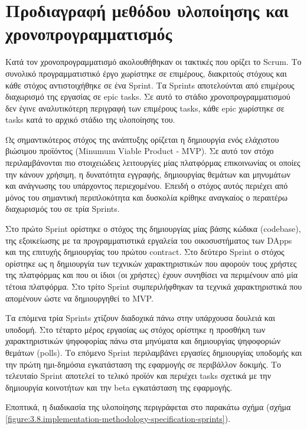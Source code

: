 \section{Προδιαγραφή μεθόδου υλοποίησης και χρονοπρογραμματισμός} \label{section:3-8-implementation-methodology-specification}

Κατά τον χρονοπρογραμματισμό ακολουθήθηκαν οι τακτικές που ορίζει το Scrum. Το συνολικό προγραμματιστικό έργο χωρίστηκε σε επιμέρους, διακριτούς στόχους και κάθε στόχος αντιστοιχήθηκε σε ένα Sprint. Τα Sprints αποτελούνται από επιμέρους διαχωρισμό της εργασίας σε epic tasks. Σε αυτό το στάδιο χρονοπρογραμματισμού δεν έγινε αναλυτικότερη περιγραφή των επιμέρους tasks, κάθε epic χωρίστηκε σε tasks κατά το αρχικό στάδιο της υλοποίησης του.

Ως σημαντικότερος στόχος της ανάπτυξης ορίζεται η δημιουργία ενός ελάχιστου βιώσιμου προϊόντος (Minumum Viable Product - MVP). Σε αυτό τον στόχο περιλαμβάνονται πιο στοιχειώδεις λειτουργίες μίας πλατφόρμας επικοινωνίας οι οποίες την κάνουν χρήσιμη, η δυνατότητα εγγραφής, δημιουργίας θεμάτων και μηνυμάτων και ανάγνωσης του υπάρχοντος περιεχομένου. Επειδή ο στόχος αυτός περιέχει από μόνος του σημαντική περιπλοκότητα και δυσκολία κρίθηκε αναγκαίος ο περαιτέρω διαχωρισμός του σε τρία Sprints.

Στο πρώτο Sprint ορίστηκε ο στόχος της δημιουργίας μίας βάσης κώδικα (codebase), της εξοικείωσης με τα προγραμματιστικά εργαλεία του οικοσυστήματος των DApps και της επιτυχής δημιουργίας του πρώτου contract. Στο δεύτερο Sprint ο στόχος ορίστηκε ως η δημιουργία των τεχνικών χαρακτηριστικών που αφορούν τους χρήστες της πλατφόρμας και που οι ίδιοι (οι χρήστες) έχουν συνηθίσει να περιμένουν από μία τέτοια πλατφόρμα. Στο τρίτο Sprint συμπεριλήφθηκαν τα τεχνικά χαρακτηριστικά που απομένουν ώστε να δημιουργηθεί το MVP.

Τα επόμενα τρία Sprints χτίζουν διαδοχικά πάνω στην υπάρχουσα δουλειά και υποδομή. Στο τέταρτο μέρος εργασίας ως στόχος ορίστηκε η προσθήκη των χαρακτηριστικών ψηφοφορίας πάνω στα μηνύματα και δημιουργίας ψηφοφοριών θεμάτων (polls). Το επόμενο Sprint περιλαμβάνει εργασίες δημιουργίας υποδομής και την πρώτη ημι-δημόσια εγκατάσταση της εφαρμογής σε περιβάλλον δοκιμής. Το τελευταίο Sprint αποτελεί το τελικό προϊόν και περιέχει tasks σχετικά με την δημιουργία κοινοτήτων και την beta εγκατάσταση της εφαρμογής.

Εποπτικά, η διαδικασία της υλοποίησης περιγράφεται στο παρακάτω σχήμα (σχήμα \ref{figure:3.8.implementation-methodology-specification-sprints}).

